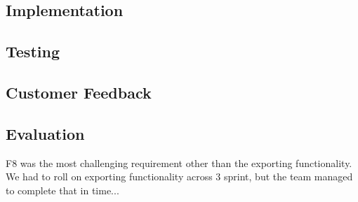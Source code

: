 	\subsection{Implementation}
	\subsection{Testing}

	\subsection{Customer Feedback}

	\subsection{Evaluation} 
F8 was the most challenging requirement other than the exporting functionality. We had to roll on exporting functionality across 3 sprint, but the team managed to complete that in time... 